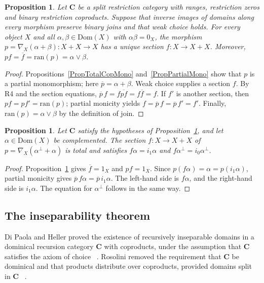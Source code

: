 \documentclass[letterpaper,10pt]{amsart}
\theoremstyle{plain}
\newtheorem{prop}[thm]{Proposition}
\theoremstyle{definition}
\newcommand{\rst}[1]{\overline{#1}}
\begin{document}
\begin{prop}\label{PropCopOut}
Let $\mathbf C$ be a split restriction category with ranges,
restriction zeros and binary restriction coproducts. Suppose that inverse
images of domains along every morphism preserve binary joins and that
weak choice holds.
For every object $X$ and all $\alpha,\beta\in\mathrm{Dom}(X)$ with $\alpha\beta=0_X$,
the morphism $p=\nabla_X(\alpha+\beta):X+X\to X$ has a unique section
$f:X\to X+X$. Moreover, $pf=\rst f=\mathrm{ran}(p)=\alpha\vee\beta$.
\end{prop}
\begin{proof}
Propositions~\ref{PropTotalCopMono} and~\ref{PropPartialMono} show
that $p$ is a partial monomorphism; here $\rst p=\alpha+\beta$.
Weak choice supplies a section $f$. By R4 and the section equations,
$\rst p\,f=f\rst{pf}=f\rst f=f$.
If $f'$ is another section, then $pf=pf'=\mathrm{ran}(p)$;
partial monicity yields $f=\rst p\,f=\rst p\,f'=f'$.
Finally, $\mathrm{ran}(p)=\alpha\vee\beta$ by the definition of join.
\end{proof}

\begin{prop}\label{PropDichotomy}
Let $\mathbf C$ satisfy the hypotheses of Proposition~\ref{PropCopOut},
and let $\alpha\in\mathrm{Dom}(X)$ be complemented. The section
$f:X\to X+X$ of $p=\nabla_X(\alpha^\perp+\alpha)$ is total and satisfies $f\alpha=i_1\alpha$ and
$f\alpha^\perp=i_0\alpha^\perp$.
\end{prop}
\begin{proof}
Proposition~\ref{PropCopOut} gives $\rst f=1_X$ and $pf=1_X$.
Since $p(f\alpha)=\alpha=p(i_1\alpha)$, partial monicity gives
$\rst p\,f\alpha=\rst p\,i_1\alpha$.
The left-hand side is $f\alpha$, and the right-hand side is
$i_1\alpha$. The equation for $\alpha^\perp$ follows in the same way.
\end{proof}

\subsection{The inseparability theorem}
Di Paola and Heller proved the existence of
recursively inseparable domains in a dominical recursion category
$\mathbf{C}$ with coproducts, under the assumption that $\mathbf{C}$ satisfies the
axiom of choice ~\cite[Theorem 8.15]{MR88i:03078}. Rosolini removed the requirement that $\mathbf{C}$ be dominical and that products distribute over coproducts, 
provided domains split in $\mathbf{C}$ ~\cite{MR90e:18001}.
\end{document}
